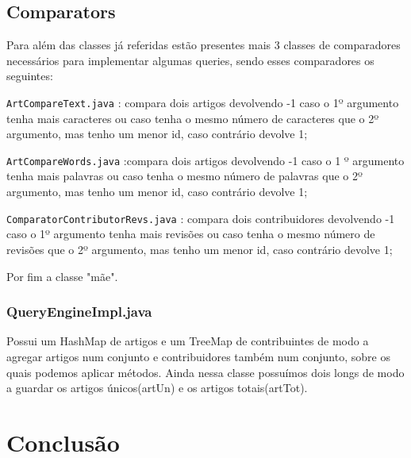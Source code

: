 \documentclass[a4paper,11pt]{article}
\begin{document}
\subsection{Comparators}
Para além das classes já referidas estão presentes mais 3 classes de comparadores necessários para implementar algumas queries, sendo esses comparadores os seguintes:
\begin{itemsize}
\item[\texttt{ArtCompareText.java}]: compara dois artigos devolvendo -1 caso o 1º argumento tenha mais caracteres ou caso tenha o mesmo número de caracteres que o 2º argumento, mas tenho um menor id, caso contrário devolve 1;
\item[\texttt{ArtCompareWords.java}]:compara dois artigos devolvendo -1 caso o 1    º argumento tenha mais palavras ou caso tenha o mesmo número de palavras que o 2º argumento, mas tenho um menor id, caso contrário devolve 1;
\item[\texttt{ComparatorContributorRevs.java}]: compara dois contribuidores devolvendo -1 caso o 1º argumento tenha mais revisões ou caso tenha o mesmo número de revisões que o 2º argumento, mas tenho um menor id, caso contrário devolve 1;
\end{itemsize}

Por fim a classe "mãe". 

\subsubsection{QueryEngineImpl.java}
Possui um HashMap de artigos e um TreeMap de contribuintes de modo a agregar artigos num conjunto e contribuidores também num conjunto, sobre os quais podemos aplicar métodos. Ainda nessa classe possuímos dois longs de modo a guardar os artigos únicos(artUn) e os artigos totais(artTot).

\section{Conclusão}
\end{document}
